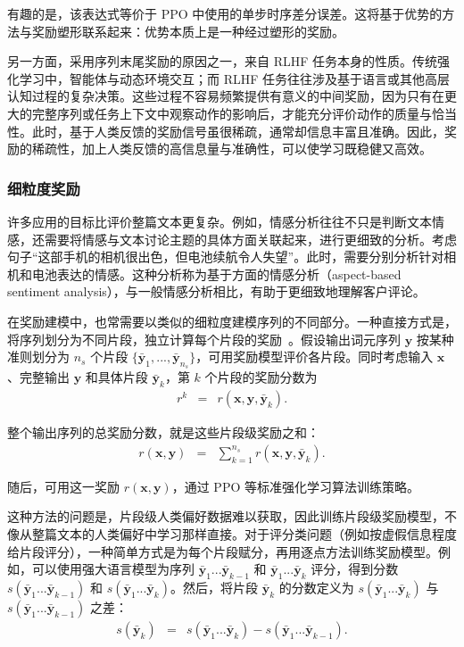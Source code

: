 \noindent 有趣的是，该表达式等价于 PPO 中使用的单步时序差分误差。这将基于优势的方法与奖励塑形联系起来：优势本质上是一种经过塑形的奖励。

另一方面，采用序列末尾奖励的原因之一，来自 RLHF 任务本身的性质。传统强化学习中，智能体与动态环境交互；而 RLHF 任务往往涉及基于语言或其他高层认知过程的复杂决策。这些过程不容易频繁提供有意义的中间奖励，因为只有在更大的完整序列或任务上下文中观察动作的影响后，才能充分评价动作的质量与恰当性。此时，基于人类反馈的奖励信号虽很稀疏，通常却信息丰富且准确。因此，奖励的稀疏性，加上人类反馈的高信息量与准确性，可以使学习既稳健又高效。

\subsubsection{细粒度奖励}
\label{sec:fine-grained-rewards}

\noindent 许多应用的目标比评价整篇文本更复杂。例如，情感分析往往不只是判断文本情感，还需要将情感与文本讨论主题的具体方面关联起来，进行更细致的分析。考虑句子“这部手机的相机很出色，但电池续航令人失望”。此时，需要分别分析针对相机和电池表达的情感。这种分析称为基于方面的情感分析（aspect-based sentiment analysis），与一般情感分析相比，有助于更细致地理解客户评论。

在奖励建模中，也常需要以类似的细粒度建模序列的不同部分。一种直接方式是，将序列划分为不同片段，独立计算每个片段的奖励~\cite{wu-etal:2023finegrained}。假设输出词元序列 $\mathbf{y}$ 按某种准则划分为 $n_s$ 个片段 $\{\bar{\mathbf{y}}_1,...,\bar{\mathbf{y}}_{n_s}\}$，可用奖励模型评价各片段。同时考虑输入 $\mathbf{x}$、完整输出 $\mathbf{y}$ 和具体片段 $\bar{\mathbf{y}}_k$，第 $k$ 个片段的奖励分数为
\begin{eqnarray}
r^k & = & r(\mathbf{x}, \mathbf{y}, \bar{\mathbf{y}}_k).
\end{eqnarray}

\noindent 整个输出序列的总奖励分数，就是这些片段级奖励之和：
\begin{eqnarray}
r(\mathbf{x},\mathbf{y}) & = & \sum_{k=1}^{n_s} r(\mathbf{x}, \mathbf{y}, \bar{\mathbf{y}}_k).
\end{eqnarray}

\noindent 随后，可用这一奖励 $r(\mathbf{x},\mathbf{y})$，通过 PPO 等标准强化学习算法训练策略。

这种方法的问题是，片段级人类偏好数据难以获取，因此训练片段级奖励模型，不像从整篇文本的人类偏好中学习那样直接。对于评分类问题（例如按虚假信息程度给片段评分），一种简单方式是为每个片段赋分，再用逐点方法训练奖励模型。例如，可以使用强大语言模型为序列 $\bar{\mathbf{y}}_1...\bar{\mathbf{y}}_{k-1}$ 和 $\bar{\mathbf{y}}_1...\bar{\mathbf{y}}_k$ 评分，得到分数 $s(\bar{\mathbf{y}}_1...\bar{\mathbf{y}}_{k-1})$ 和 $s(\bar{\mathbf{y}}_1...\bar{\mathbf{y}}_k)$。然后，将片段 $\bar{\mathbf{y}}_{k}$ 的分数定义为 $s(\bar{\mathbf{y}}_1...\bar{\mathbf{y}}_k)$ 与 $s(\bar{\mathbf{y}}_1...\bar{\mathbf{y}}_{k-1})$ 之差：
\begin{eqnarray}
s(\bar{\mathbf{y}}_k) & = &s(\bar{\mathbf{y}}_1...\bar{\mathbf{y}}_k) - s(\bar{\mathbf{y}}_1...\bar{\mathbf{y}}_{k-1}).
\end{eqnarray}

